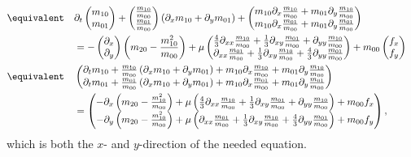 \begin{equation*}
\begin{aligned}
\\
\equivalent \quad
&\partial_t \begin{pmatrix}m_{10} \\m_{01}  \end{pmatrix}
+ \begin{pmatrix}\frac{m_{10}}{m_{00}} \\\frac{m_{01}}{m_{00}}  \end{pmatrix}
\left(\partial_x m_{10} + \partial_y  m_{01} \right)
+ \begin{pmatrix}m_{10}\partial_x \frac{m_{10}}{m_{00}} + m_{01}\partial_y \frac{m_{10}}{m_{00}} \\
  m_{10}\partial_x\frac{m_{01}}{m_{00}} + m_{01}\partial_y\frac{m_{01}}{m_{00}}  \end{pmatrix}
\\&= - \begin{pmatrix}\partial_x \\\partial_y  \end{pmatrix} \left(m_{20} - \frac{ m_{10}^2 }{ m_{00} } \right)
+ \mu
\begin{pmatrix}
\frac{4}{3}\partial_{xx} \frac{m_{10}}{m_{00}} + \frac{1}{3}\partial_{xy} \frac{m_{01}}{m_{00}} + \partial_{yy} \frac{m_{10}}{m_{00}} \\
\partial_{xx} \frac{m_{01}}{m_{00}} +\frac{1}{3}\partial_{xy} \frac{m_{10}}{m_{00}} + \frac{4}{3}\partial_{yy} \frac{m_{01}}{m_{00}}
\end{pmatrix} + m_{00} \begin{pmatrix}f_x\\f_y \end{pmatrix}
\\
\equivalent \quad
& \begin{pmatrix}
\partial_t m_{10}
+ \frac{m_{10}}{m_{00}}\left(\partial_x m_{10} + \partial_y  m_{01} \right)
+ m_{10}\partial_x \frac{m_{10}}{m_{00}} + m_{01}\partial_y \frac{m_{10}}{m_{00}}
\\
\partial_t m_{01}
+ \frac{m_{01}}{m_{00}} \left(\partial_x m_{10} + \partial_y  m_{01} \right)
+ m_{10}\partial_x\frac{m_{01}}{m_{00}} + m_{01}\partial_y\frac{m_{01}}{m_{00}}
\end{pmatrix}
\\&=  \begin{pmatrix}
-\partial_x \left(m_{20} - \frac{ m_{10}^2 }{ m_{00} } \right)
+\mu\left(
\frac{4}{3}\partial_{xx} \frac{m_{10}}{m_{00}} + \frac{1}{3}\partial_{xy} \frac{m_{01}}{m_{00}} + \partial_{yy} \frac{m_{10}}{m_{00}} \right)
+ m_{00}f_x
\\
-\partial_y  \left(m_{20} - \frac{ m_{10}^2 }{ m_{00} } \right)
+ \mu
\left(
\partial_{xx} \frac{m_{01}}{m_{00}} +\frac{1}{3}\partial_{xy} \frac{m_{10}}{m_{00}} + \frac{4}{3}\partial_{yy} \frac{m_{01}}{m_{00}}
\right)
+ m_{00} f_y \end{pmatrix},
\end{aligned}
\end{equation*}
which is both the $x$- and $y$-direction of the needed equation.
